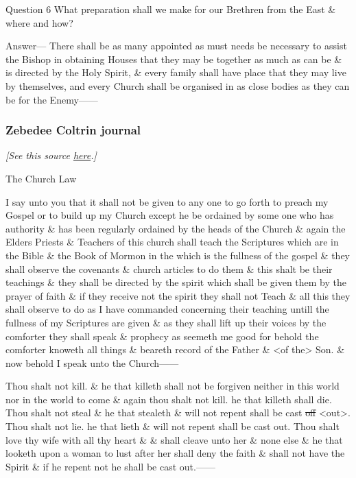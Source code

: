 			Question 6 What preparation shall we make for our Brethren from the East \& where and how?

			Answer--- There shall be as many appointed as must needs be necessary to assist the Bishop in obtaining Houses that they may be together as much as can be \& is directed by the Holy Spirit, \& every family shall have place that they may live by themselves, and every Church shall be organised in as close bodies as they can be for the Enemy------

			
		\subsubsection{Zebedee Coltrin journal}
			\label{EXSS-DC42-EARLY-COLTRIN}
			
			\textit{[See this source \href{https://www.josephsmithpapers.org/paper-summary/revelation-9-february-1831-as-recorded-in-coltrin-diary-dc-4211-69/1}{here}.]}
			
			\begin{tightcenter}
				The Church Law
			\end{tightcenter}

			I say unto you that it shall not be given to any one to go forth to preach my Gospel or to build up my Church except he be ordained by some one who has authority \& has been regularly ordained by the heads of the Church \& again the Elders Priests \& Teachers of this church shall teach the Scriptures which are in the Bible \& the Book of Mormon in the which is the fullness of the gospel \& they shall observe the covenants \& church articles to do them \& this shalt be their teachings \& they shall be directed by the spirit which shall be given them by the prayer of faith \& if they receive not the spirit they shall not Teach \& all this they shall observe to do as I have commanded concerning their teaching untill the fullness of my Scriptures are given \& as they shall lift up their voices by the comforter they shall speak \& prophecy as seemeth me good for behold the comforter knoweth all things \& beareth record of the Father \& <of the> Son. \& now behold I speak unto the Church------

			Thou shalt not kill. \& he that killeth shall not be forgiven neither in this world nor in the world to come \& again thou shalt not kill. he that killeth shall die. Thou shalt not steal \& he that stealeth \& will not repent shall be cast \sout{off} <out>. Thou shalt not lie. he that lieth \& will not repent shall be cast out. Thou shalt love thy wife with all thy heart \& \& shall cleave unto her \& none else \& he that looketh upon a woman to lust after her shall deny the faith \& shall not have the Spirit \& if he repent not he shall be cast out.------


